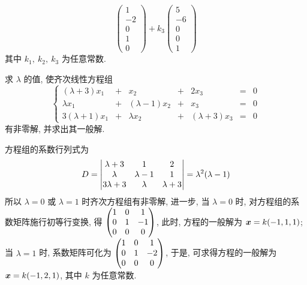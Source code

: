 \begin{solution}
\begin{enumerate}[label=(\arabic{*})]
$$\begin{pmatrix}
                      1  \\
                      -2 \\
                      0  \\
                      1  \\
                      0
                  \end{pmatrix}+k_3\begin{pmatrix}
                      5  \\
                      -6 \\
                      0  \\
                      0  \\
                      1
                  \end{pmatrix}$$
              其中 $k_1,~k_2,~k_3$ 为任意常数.
    \end{enumerate}
\end{solution}

\begin{example}
    求 $\lambda$ 的值, 使齐次线性方程组
    $$\left\{\begin{matrix}
            (\lambda +3)x_1  & + & x_2             & + & 2x_3            & = & 0 \\
            \lambda x_1      & + & (\lambda -1)x_2 & + & x_3             & = & 0 \\
            3(\lambda +1)x_1 & + & \lambda x_2     & + & (\lambda +3)x_3 & = & 0
        \end{matrix}\right.$$ 有非零解, 并求出其一般解.
\end{example}
\begin{solution}
    方程组的系数行列式为 $$D=\mqty|\lambda +3&1&2\\\lambda&\lambda-1&1\\3\lambda+3&\lambda&\lambda +3|=\lambda^2(\lambda-1)$$
    所以 $\lambda=0$ 或 $\lambda=1$ 时齐次方程组有非零解, 进一步, 当 $\lambda=0$ 时, 对方程组的系数矩阵施行初等行变换, 得
    $\mqty(1&0&1\\0&1&-1\\0&0&0)$, 此时, 方程的一般解为 $\vb*{x}=k(-1,1,1)$; 当 $\lambda=1$ 时, 系数矩阵可化为
    $\mqty(1&0&1\\0&1&-2\\0&0&0)$, 于是, 可求得方程的一般解为 $\vb*{x}=k(-1,2,1)$, 其中 $k$ 为任意常数.
\end{solution}

